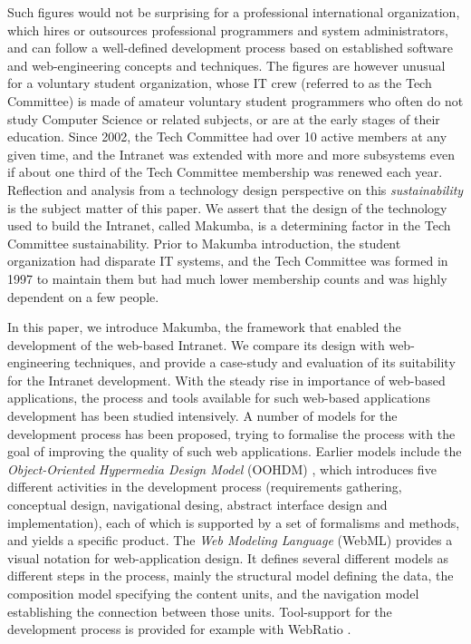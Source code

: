 \documentclass{llncs}
\begin{document}
Such figures would not be surprising for a professional international organization, which hires or outsources professional programmers and system administrators, and can follow a well-defined development process based on established software and web-engineering concepts and techniques.
The figures are however unusual for a voluntary student organization, whose IT crew (referred to as the Tech Committee) is made of amateur voluntary student programmers who often do not study Computer Science or related subjects, or are at the early stages of their education. 
Since 2002, the Tech Committee had over 10 active members at any given time, and the Intranet was extended with more and more subsystems even if about one third of the Tech Committee membership was renewed each year. Reflection and analysis from a technology design perspective on this {\it sustainability}  is the subject matter of this paper. We assert that the design of the technology used to build the Intranet, called Makumba, is a determining factor in the Tech Committee sustainability.
Prior to Makumba introduction, the student organization had disparate IT systems, and the Tech Committee was formed in 1997 to maintain them but had much lower membership counts and was highly dependent on a few people.

In this paper, we introduce Makumba, the framework that enabled the development of the web-based Intranet. We compare its design with web-engineering techniques, and provide a case-study and evaluation of its suitability for the Intranet development. With the steady rise in importance of web-based applications, the process and tools available for such web-based applications development has been studied intensively. A number of models for the development process has been proposed, trying to formalise the process with the goal of improving the quality of such web applications. Earlier models include the \textit{Object-Oriented Hypermedia Design Model} (OOHDM) \cite{schwabe1998ooa}, which introduces five different activities in the development process (requirements gathering, conceptual design, navigational desing, abstract interface design and implementation), each of which is supported by a set of formalisms and methods, and yields a specific product. The \textit{Web Modeling Language} (WebML) \cite{Ceri00webmodeling} provides a visual notation for web-application design. It defines several different models as different steps in the process, mainly the structural model defining the data, the composition model specifying the content units, and the navigation model establishing the connection between those units. Tool-support for the development process is provided for example with WebRatio \cite{acerbis2004wit}.
\end{document}
